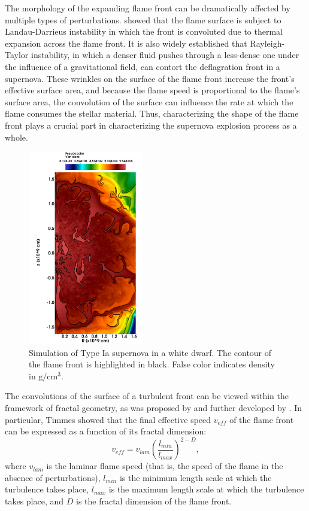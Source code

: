 \documentclass{emulateapj}
\begin{document}
The morphology of the expanding flame front can be dramatically affected by multiple types of perturbations. \cite{Landau1959} showed that the flame surface is subject to Landau-Darrieus instability in which the front is convoluted due to thermal expansion across the flame front. It is also widely established \citep{Khokhlov} that Rayleigh-Taylor instability, in which a denser fluid pushes through a less-dense one under the influence of a gravitational field, can contort the deflagration front in a supernova. These wrinkles on the surface of the flame front increase the front's effective surface area, and because the flame speed is proportional to the flame's surface area, the convolution of the surface can influence the rate at which the flame consumes the stellar material. Thus, characterizing the shape of the flame front plays a crucial part in characterizing the supernova explosion process as a whole.

\begin{figure}[ht]
	\begin{center}
	\includegraphics[width=0.45\textwidth,clip=true]{Graphics/n7d1r10t15b0011_cropped.png}
	\caption{Simulation of Type Ia supernova in a white dwarf. The contour of the flame front is highlighted in black. False color indicates density in $\mathrm{g/cm^3}$.
	\label{f:flamefrontwithcontour}}
	\end{center}
	\end{figure} 

The convolutions of the surface of a turbulent front can be viewed within the framework of fractal geometry, as was proposed by \cite{Mandelbrot1975} and further developed by \cite{Timmes1994}. In particular, Timmes showed that the final effective speed $v_{eff}$ of the flame front can be expressed as a function of its fractal dimension:
\begin{equation} 
	v_{eff} = v_{lam} \left(\frac{l_{min}}{l_{max}}\right)^{2 - D},
\end{equation}
where $v_{lam}$ is the laminar flame speed (that is, the speed of the flame in the absence of perturbations), $l_{min}$ is the minimum length scale at which the turbulence takes place, $l_{max}$ is the maximum length scale at which the turbulence takes place, and $ D $ is the fractal dimension of the flame front.
\end{document}
